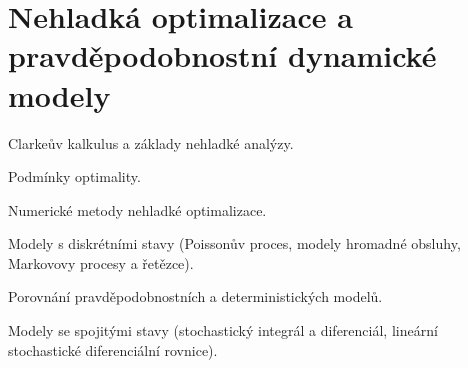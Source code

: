 \newpage
\section{Nehladká optimalizace a pravděpodobnostní dynamické modely}
\begin{pozadavky}
\begin{pitemize}
\item Clarkeův kalkulus a základy nehladké analýzy.
\item Podmínky optimality.
\item Numerické metody nehladké optimalizace.
\item Modely s diskrétními stavy (Poissonův proces, modely hromadné obsluhy, Markovovy procesy a řetězce).
\item Porovnání pravděpodobnostních a deterministických modelů.
\item Modely se spojitými stavy (stochastický integrál a diferenciál, lineární stochastické diferenciální rovnice).
\end{pitemize}
\end{pozadavky}